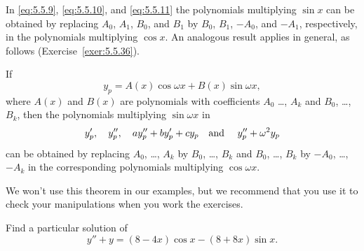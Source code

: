 
\noindent
In \eqref{eq:5.5.9}, \eqref{eq:5.5.10}, and \eqref{eq:5.5.11} the polynomials multiplying $\sin x$
can be obtained by replacing $A_{0}$, $A_{1}$, $B_{0}$, and $B_{1}$ by $B_{0}$, $B_{1}$, $-A_{0}$,
and $-A_{1}$, respectively, in the polynomials multiplying $\cos x$. An analogous result applies in
general, as follows (Exercise~\ref{exer:5.5.36}).

\begin{theorem}
  \color{blue}
  \label{thmtype:5.5.2} If
  \[
    y_{p}=A(x)\cos\omega x+B(x)\sin\omega x,
  \]
  where $A(x)$ and $B(x)$ are polynomials with coefficients $A_{0}$ \dots, $A_{k}$ and $B_{0}$,
  \dots, $B_{k}$, then the polynomials multiplying $\sin\omega x$ in
  \[
    y_{p}',\quad y_{p}'',\quad ay_{p}''+by_{p}'+cy_{p}\mbox{\quad and \quad}y_{p}''+\omega^{2}y_{p}
  \]
  can be obtained by replacing $A_{0}$, \dots, $A_{k}$ by $B_{0}$, \dots, $B_{k}$ and $B_{0}$,
  \dots, $B_{k}$ by $-A_{0}$, \dots, $-A_{k}$ in the corresponding polynomials multiplying
  $\cos\omega x$.
\end{theorem}

We won't use this theorem in our examples, but we recommend that you use it to check your
manipulations when you work the exercises.

\begin{example}
  \label{example:5.5.4} \rm Find a particular solution of
  \begin{equation}
    \label{eq:5.5.12}y''+y=(8-4x)\cos x-(8+8x)\sin x.
  \end{equation}
\end{example}

